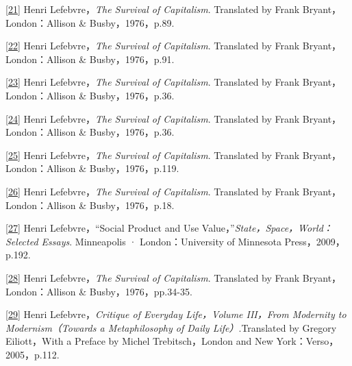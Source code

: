 \documentclass[UTF8, fontset = sourcesans, a4paper, oneside, zihao =
-4, scheme=chinese, no-math, space=true]{ctexbook}
\begin{document}
\protect\hypertarget{part0008_split_003.htmlux5cux23m21}{}{}\protect\hyperlink{part0008_split_002.htmlux5cux23w21}{{[}21{]}}
Henri Lefebvre，\emph{The Survival of Capitalism}. Translated by Frank
Bryant，London：Allison \& Busby，1976，p.89.

\protect\hypertarget{part0008_split_003.htmlux5cux23m22}{}{}\protect\hyperlink{part0008_split_002.htmlux5cux23w22}{{[}22{]}}
Henri Lefebvre，\emph{The Survival of Capitalism}. Translated by Frank
Bryant，London：Allison \& Busby，1976，p.91.

\protect\hypertarget{part0008_split_003.htmlux5cux23m23}{}{}\protect\hyperlink{part0008_split_002.htmlux5cux23w23}{{[}23{]}}
Henri Lefebvre，\emph{The Survival of Capitalism}. Translated by Frank
Bryant，London：Allison \& Busby，1976，p.36.

\protect\hypertarget{part0008_split_003.htmlux5cux23m24}{}{}\protect\hyperlink{part0008_split_002.htmlux5cux23w24}{{[}24{]}}
Henri Lefebvre，\emph{The Survival of Capitalism}. Translated by Frank
Bryant，London：Allison \& Busby，1976，p.36.

\protect\hypertarget{part0008_split_003.htmlux5cux23m25}{}{}\protect\hyperlink{part0008_split_002.htmlux5cux23w25}{{[}25{]}}
Henri Lefebvre，\emph{The Survival of Capitalism}. Translated by Frank
Bryant，London：Allison \& Busby，1976，p.119.

\protect\hypertarget{part0008_split_003.htmlux5cux23m26}{}{}\protect\hyperlink{part0008_split_002.htmlux5cux23w26}{{[}26{]}}
Henri Lefebvre，\emph{The Survival of Capitalism}. Translated by Frank
Bryant，London：Allison \& Busby，1976，p.18.

\protect\hypertarget{part0008_split_003.htmlux5cux23m27}{}{}\protect\hyperlink{part0008_split_002.htmlux5cux23w27}{{[}27{]}}
Henri Lefebvre，``Social Product and Use
Value，''\emph{State，Space，World：Selected Essays}. Minneapolis ·
London：University of Minnesota Press，2009，p.192.

\protect\hypertarget{part0008_split_003.htmlux5cux23m28}{}{}\protect\hyperlink{part0008_split_002.htmlux5cux23w28}{{[}28{]}}
Henri Lefebvre，\emph{The Survival of Capitalism}. Translated by Frank
Bryant，London：Allison \& Busby，1976，pp.34-35.

\protect\hypertarget{part0008_split_003.htmlux5cux23m29}{}{}\protect\hyperlink{part0008_split_002.htmlux5cux23w29}{{[}29{]}}
Henri Lefebvre，\emph{Critique of Everyday Life，Volume III，From
Modernity to Modernism（Towards a Metaphilosophy of Daily
Life）}.Translated by Gregory Eiliott，With a Preface by Michel
Trebitsch，London and New York：Verso，2005，p.112.
\end{document}
